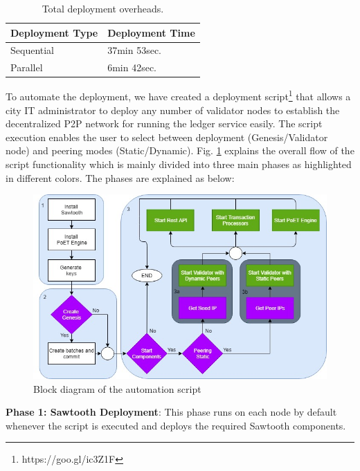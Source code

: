 \begin{table}[H]
\centering
\label{tab:dep_times}
\begin{tabular}{|l|l|}
\hline
Deployment Type & Deployment Time   \\ \hline
Sequential      & 37min 53sec.      \\ \hline
Parallel        & 6min 42sec.       \\ \hline
\end{tabular}
\caption{Total deployment overheads.}
\vspace{-4mm}
\end{table}

To automate the deployment, we have created a deployment script\footnote{https://goo.gl/ic3Z1F} that allows a city IT administrator to deploy any number of validator nodes to establish the decentralized P2P network for running the ledger service easily. The script execution enables the user to select between deployment (Genesis/Validator node) and peering modes (Static/Dynamic). Fig. \ref{fig:script} explains the overall flow of the script functionality which is mainly divided into three main phases as highlighted in different colors. The phases are explained as below:

\begin{figure}[H] %
    \centering
    \setlength{\belowcaptionskip}{-10pt}
    \includegraphics[scale=.60]{figs/block_diagram.png}
    \caption{Block diagram of the automation script}
    \label{fig:script} %
\end{figure}

\textbf{Phase 1: Sawtooth Deployment}: This phase runs on each node by default whenever the script is executed and deploys the required Sawtooth components.

